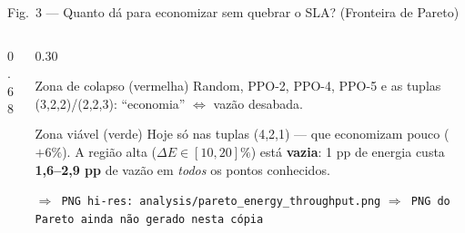 \documentclass[aspectratio=169,10pt,xcolor={dvipsnames,table}]{beamer}
\newcommand{\datapath}[1]{{\scriptsize\color{darkgray}\texttt{#1}}}
\begin{document}
\begin{frame}{Fig.\ 3 --- Quanto d\'a para economizar sem quebrar o SLA? (Fronteira de Pareto)}
\begin{columns}[T]
\begin{column}{0.68\textwidth}
\begin{center}
      \end{center}
    \end{column}
    \begin{column}{0.30\textwidth}
      \begin{alertblock}{Zona de colapso (vermelha)}
        \small Random, PPO-2, PPO-4, PPO-5 e as tuplas (3,2,2)/(2,2,3):
        ``economia'' $\Leftrightarrow$ vazão desabada.
      \end{alertblock}
      \begin{exampleblock}{Zona viável (verde)}
        \small Hoje só nas tuplas (4,2,1) --- que economizam pouco
        ($+6\%$). A região alta ($\Delta E \in [10,20]\%$) está
        \textbf{vazia}: 1 pp de energia custa \textbf{1,6--2,9 pp} de vazão
        em \emph{todos} os pontos conhecidos.
      \end{exampleblock}
        {\datapath{$\Rightarrow$ PNG hi-res: analysis/pareto\_energy\_throughput.png}}%
        {\datapath{$\Rightarrow$ PNG do Pareto ainda não gerado nesta c\'opia}}
    \end{column}
  \end{columns}
\end{frame}
\end{document}
